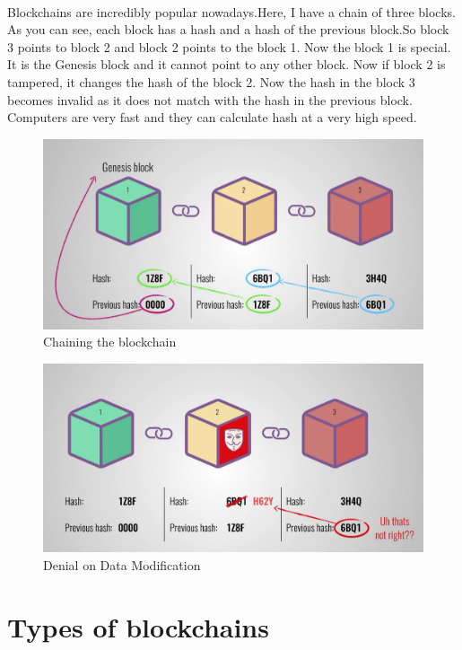 \paragraph{}Blockchains are incredibly popular nowadays.Here, I have a chain of three blocks. As you can see, each block has a hash and a hash of the previous block.So block 3 points to block 2 and block 2 points to the block 1. Now the block 1 is special. It is the Genesis block and it cannot point to any other block. Now if block 2 is tampered, it changes the hash of the block 2. Now the hash in the block 3 becomes invalid as it does not match with the hash in the previous block. Computers are very fast and they can calculate hash at a very high speed.

\begin{figure}[H]
	\centering
	\includegraphics[scale=0.3]{total_block.png}
	\caption{Chaining the blockchain}
\end{figure}

\begin{figure}[H]
	\centering
	\includegraphics[scale=0.3]{tampering_block.png}
	\caption{Denial on Data Modification}
\end{figure}

\section{Types of blockchains}

